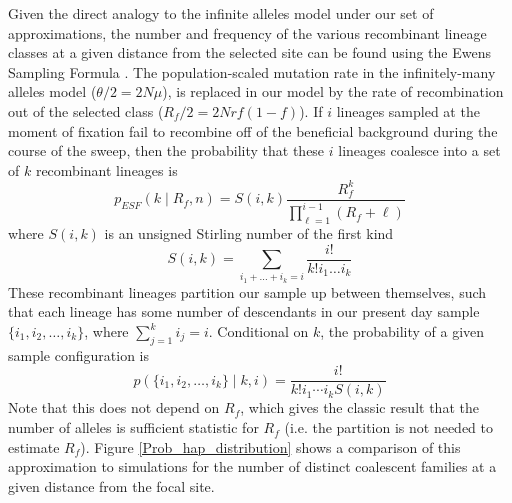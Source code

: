 \documentclass[a4paper,10pt]{article}
\begin{document}
Given the direct analogy to the infinite alleles model under our set of approximations, the number and frequency of the various recombinant lineage classes at a given distance from the selected site can be found using the Ewens Sampling Formula \citep{Ewens1972}. The population-scaled mutation rate in the infinitely-many alleles model ($\theta/2=2N\mu$), is replaced in our model by the rate of recombination out of the selected class ($R_{f}/2=2Nrf(1-f)$). If $i$ lineages sampled at the moment of fixation fail to recombine off of the beneficial background during the course of the sweep, then the probability that these $i$ lineages coalesce into a set of $k$ recombinant lineages is 
\begin{equation}
	p_{ESF}(k \mid R_f,n)  = S(i,k) \frac{R_f^k}{ \prod_{\ell=1}^{i-1} (R_f +\ell) }  \label{ESF1}
\end{equation}
where $S(i,k)$ is an unsigned Stirling number of the first kind
\begin{equation}
	S(i,k) = \sum_{i_1 + \dots + i_k = i} \frac{i!}{k!i_1\dots i_k}
\end{equation}
These recombinant lineages partition our sample up between themselves, such that each lineage has some number of descendants in our present day sample $\{i_1,i_2,\dots,i_k\}$, where $\sum_{j=1}^k i_j =i$. Conditional on $k$, the probability of a given sample configuration is
\begin{equation}
	p(\{i_1,i_2,\dots,i_k\} \mid k,i) = \frac{i!}{k! i_1\cdots i_k S(i,k)}  \label{ESF2}
\end{equation}
Note that this does not depend on $R_f$, which gives the classic result that the number of alleles is sufficient statistic for $R_f$ (i.e. the partition is not needed to estimate $R_f$). Figure \ref{Prob_hap_distribution} shows a comparison of this approximation to simulations for the number of distinct coalescent families at a given distance from the focal site.
\end{document}
